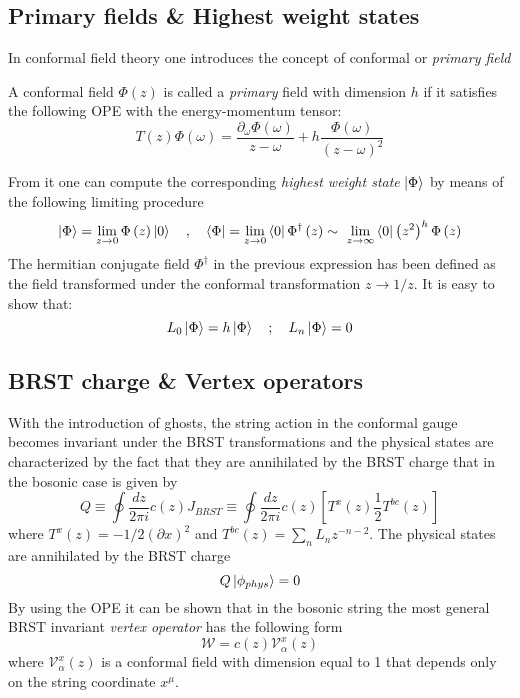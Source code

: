\subsection{Primary fields \& Highest weight states}
In conformal field theory one introduces the concept of conformal or
\textit{primary field} 
\begin{definition}
  A conformal field $\Phi(z)$ is called a \textit{primary} field with dimension
  $h$ if it satisfies the following OPE with the energy-momentum tensor:
\begin{equation}
	T\left(z\right)\Phi\left(\omega\right) = \frac{\partial_\omega\Phi\left(\omega\right)}{z-\omega} + h\frac{\Phi\left(\omega\right)}{\left(z-\omega\right)^2}
\end{equation}
\end{definition}
From it one can compute the corresponding \textit{highest weight state} $\ket{\Phi}$ by means of the following limiting procedure
\begin{equation}
\ket{\Phi} = \lim_{z\rightarrow 0}\Phi\left(z\right)\ket{0}\quad,\quad\bra{\Phi} = \lim_{z\rightarrow 0}\bra{0}\Phi^{\dagger}\left(z\right)\sim\ \lim_{z\rightarrow \infty}\bra{0}\left(z^2\right)^h\Phi\left(z\right)
\end{equation}
The hermitian conjugate field $\Phi^{\dagger}$ in the previous expression has been defined as the field transformed under the conformal transformation $z\rightarrow 1/z$. It is easy to show that:
\begin{equation}
	L_0\ket{\Phi} = h\ket{\Phi}\quad;\quad L_n\ket{\Phi} = 0
\end{equation}
\subsection{BRST charge \& Vertex operators}
\par With the introduction of ghosts, the string action in the conformal gauge becomes invariant under the BRST transformations and the physical states are characterized by the fact that they are annihilated by the BRST charge that in the bosonic case is given by
\begin{equation}
	Q\equiv \oint{\frac{dz}{2\pi i }c\left(z\right)J_{BRST}} \equiv \oint{\frac{dz}{2\pi i }c\left(z\right)\left[T^x\left(z\right)  \frac{1}{2}T^{bc}\left(z\right)\right]}
\end{equation}
where $T^x\left(z\right)= -1/2\left(\partial x\right)^2$ and $T^{bc}\left(z\right) = \sum_n{L_n z^{-n-2}}$. The physical states are annihilated by the BRST charge
\begin{equation}
	Q\ket{\phi_{phys}} = 0
\end{equation}
By using the OPE it can be shown that in the bosonic string the most general BRST invariant \textit{vertex operator} has the following form
\begin{equation}
	\mathcal{W}= c\left(z\right)\mathcal{V}_\alpha^x\left(z\right)
\end{equation}
where $\mathcal{V}_\alpha^x\left(z\right)$ is a conformal field with dimension
equal to 1 that depends only on the string coordinate $x^\mu$.
